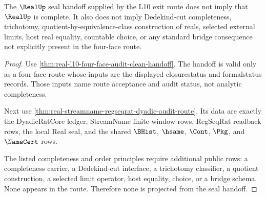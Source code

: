 \begin{theorem}
\label{thm:real-up-no-completeness-from-seal}
The $\RealUp$ seal handoff supplied by the L10 exit route does not imply that $\RealUp$ is complete. It also does not imply Dedekind-cut completeness, trichotomy, quotient-by-equivalence-class construction of reals, selected external limits, host real equality, countable choice, or any standard bridge consequence not explicitly present in the four-face route.
\end{theorem}
\begin{proof}
Use \autoref{thm:real-l10-four-face-audit-clean-handoff}. The handoff is valid only as a four-face route whose inputs are the displayed closurestatus and formalstatus records. Those inputs name route acceptance and audit status, not analytic completeness.

Next use \autoref{thm:real-streamname-regseqrat-dyadic-audit-route}. Its data are exactly the DyadicRatCore ledger, StreamName finite-window rows, RegSeqRat readback rows, the local Real seal, and the shared $\BHist$, $\hsame$, $\Cont$, $\Pkg$, and $\NameCert$ rows.

The listed completeness and order principles require additional public rows: a completeness carrier, a Dedekind-cut interface, a trichotomy classifier, a quotient construction, a selected limit operator, host equality, choice, or a bridge schema. None appears in the route. Therefore none is projected from the seal handoff.
\end{proof}
